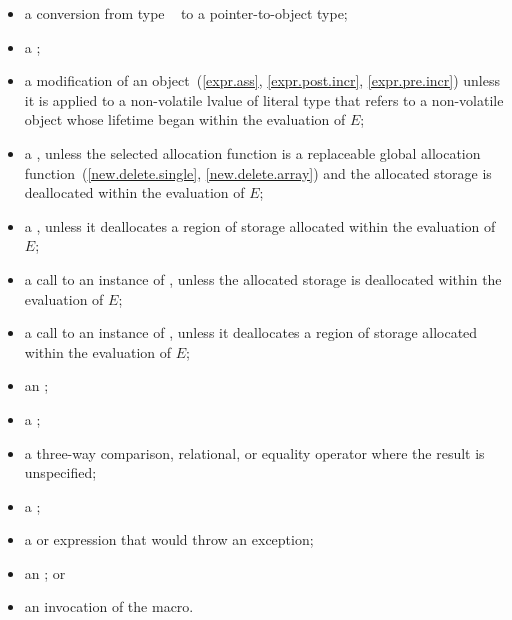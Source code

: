 \begin{itemize}
\begin{note}
\begin{example}
\begin{codeblock}
// OK to capture objects with automatic storage duration created during constant expression evaluation.
static_assert(bind(monad(2))(monad)() == monad(2)());
\end{codeblock}
\end{example}
\end{note}

\item
a conversion from type \cv{}~ to a pointer-to-object type;

\item
a ;

\item
a modification of an object~(\ref{expr.ass}, \ref{expr.post.incr},
\ref{expr.pre.incr})
unless it is applied to a non-volatile lvalue of literal type
that refers to a non-volatile object
whose lifetime began within the evaluation of $E$;

\item
a ,
unless the selected allocation function is
a replaceable global allocation function~(\ref{new.delete.single},
\ref{new.delete.array}) and
the allocated storage is deallocated within the evaluation of $E$;

\item
a ,
unless it deallocates a region of storage
allocated within the evaluation of $E$;

\item
a call to an instance of
,
unless the allocated storage is deallocated within the evaluation of $E$;

\item
a call to an instance of
,
unless it deallocates a region of storage
allocated within the evaluation of $E$;

\item
an ;

\item
a ;

\item
a three-way comparison,
relational, or equality
operator where the result is unspecified;

\item
a ;

\item
a  or  expression
that would throw an exception;

\item
an ; or

\item
an invocation of the  macro.
\end{itemize}

